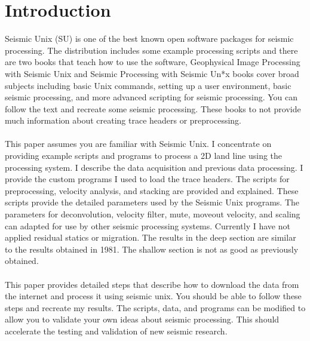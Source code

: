 \section{Introduction}
Seismic Unix (SU) is one of the best known open software packages for seismic processing.  The distribution includes some example processing scripts and there are two books that teach how to use the software, Geophysical Image Processing with Seismic Unix \cite[]{stockwell} and Seismic Processing with Seismic Un*x \cite[]{forel} books cover broad subjects including basic Unix commands, setting up a user environment, basic seismic processing, and more advanced scripting for seismic processing.  You can follow the text and recreate some seismic processing.  These books to not provide much information about creating trace headers or preprocessing.\nocite{cohen} \\
\\
This paper assumes you are familiar with Seismic Unix.  I concentrate on providing example scripts and programs to process a 2D  land line using the processing system. I describe the data acquisition and previous data processing.  I provide the custom programs I used to load the trace headers.  The scripts for preprocessing, velocity analysis, and stacking are provided and explained.  These scripts provide the detailed parameters used by the Seismic Unix programs.  The parameters for deconvolution, velocity filter, mute, moveout velocity, and scaling can adapted for use by other seismic processing systems.  Currently I have not applied residual statics or migration.  The results in the deep section are similar to the results obtained in 1981.  The shallow section is not as good as previously obtained.\\
\\
This paper provides detailed steps that describe how to download the data from the internet and process it using seismic unix.  You should be able to follow these steps and recreate my results.  The scripts, data, and programs can be modified to allow you to validate your own ideas about seismic processing.  This should accelerate the testing and validation of new seismic research.\\

